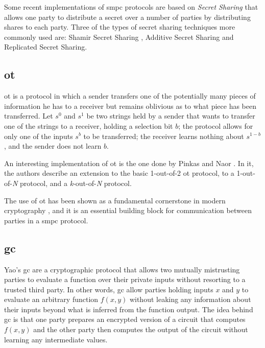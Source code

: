 Some recent implementations of \ac{smpc} protocols are based on \textit{Secret Sharing} that allows one party to distribute a secret over a number of parties by distributing shares to each party. Three of the types of secret sharing techniques more commonly used are: Shamir Secret Sharing \cite{shamir1979share}, Additive Secret Sharing and Replicated Secret Sharing.






\subsection{\acl{ot}}
\label{ssec:ObliviousTransfer}


\acf{ot} \cite{rabin2005exchange} is a protocol in which a sender transfers one of the potentially many pieces of information he has to a receiver but remains oblivious as to what piece has been transferred. Let $s^0$ and $s^1$ be two strings held by a sender that wants to transfer one of the strings to a receiver, holding a selection bit $b$; the protocol allows for only one of the inputs $s^b$ to be transferred; the receiver learns nothing about $s^{1-b}$, and the sender does not learn $b$. 

An interesting implementation of \ac{ot} is the one done by Pinkas and Naor \cite{naor2005computationally}. In it, the authors describe an extension to the basic 1-out-of-2 \ac{ot} protocol, to a 1-out-of-\textit{N} protocol, and a \textit{k}-out-of-\textit{N} protocol.

The use of \ac{ot} has been shown as a fundamental cornerstone in modern cryptography \cite{kilian1988founding}, and it is an essential building block for communication between parties in a \ac{smpc} protocol.


\subsection{\acl{gc}} 
\label{ssec:GarbledCircuits}


Yao's \acf{gc} \cite{yao1986generate} are a cryptographic protocol that allows two mutually mistrusting parties to evaluate a function over their private inputs without resorting to a trusted third party. In other words, \ac{gc} allow parties holding inputs $x$ and $y$ to evaluate an arbitrary function $f(x,y)$ without leaking any information about their inputs beyond what is inferred from the function output. The idea behind \ac{gc} is that one party prepares an encrypted version of a circuit that computes $f(x,y)$ and the other party then computes the output of the circuit without learning any intermediate values.

